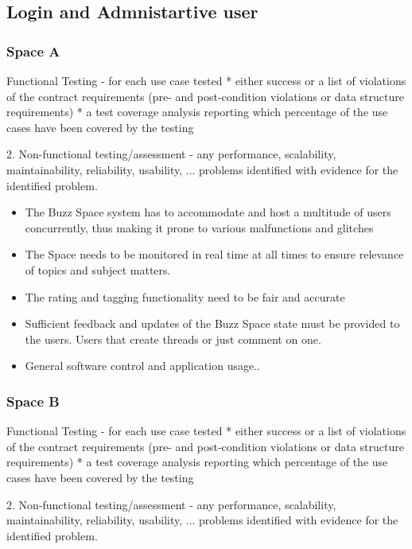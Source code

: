 \subsection{Login and Admnistartive user}
	\subsubsection*{Space A}
		Functional Testing
		- for each use case tested
		* either success or a list of violations of the contract requirements (pre- and post-condition violations or data structure requirements)
		* a test coverage analysis reporting which percentage of the use cases have been covered by the testing
		
		2. Non-functional testing/assessment
		- any performance, scalability, maintainability, reliability, usability, ... problems identified with evidence for the identified problem.
	
				
					\begin{itemize}
							\item The Buzz Space system has to accommodate and host a multitude of users concurrently, thus making it prone to various malfunctions and glitches
							
							\item The Space needs to be monitored in real time at all times to ensure relevance of topics and subject matters.
							\item The rating and tagging functionality need to be fair and accurate
							
							\item Sufficient feedback and updates of the Buzz Space state must be provided to the users. Users that create threads or just comment on one.
							
							\item General software control and application usage..
						 \end{itemize}
	
	
	
	\subsubsection*{Space B}
		Functional Testing
		- for each use case tested
		* either success or a list of violations of the contract requirements (pre- and post-condition violations or data structure requirements)
		* a test coverage analysis reporting which percentage of the use cases have been covered by the testing
		
		2. Non-functional testing/assessment
		- any performance, scalability, maintainability, reliability, usability, ... problems identified with evidence for the identified problem.
	

